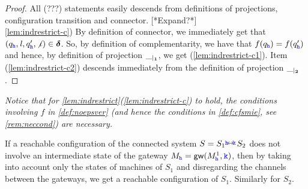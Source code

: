 \begin{proof}
All (???) statements easily
descends from definitions of projections, configuration transition and connector.
[*Expand?*]\\
\ref{lem:indrestrict-c})
By definition of connector, we immediately get that $(q_{\mathtt{\color{blue}{ {h}}}},\mathit{l},q'_{\mathtt{\color{blue}{ {h}}}},\not\iota)\in\bm{\delta}$.
So, by definition of complementarity, we have that $f(q_{\mathtt{\color{blue}{ {h}}}})=f(q'_{\mathtt{\color{blue}{ {h}}}})$ and hence,
by definition of projection ${\_}_{\mid_{\mathbf{1}}}$, we get (\ref{lem:indrestrict-c1}).
Item (\ref{lem:indrestrict-c2}) descends immediately from the definition of projection ${\_}_{\mid_{\mathbf{2}}}$.
\end{proof}

\begin{remark}{\em
Notice that for \cref{lem:indrestrict}(\ref{lem:indrestrict-c}) to hold,  
the conditions involving $f$ in \cref{def:noepsver} (and hence the conditions in \cref{def:cfsmie},
see \cref{rem:neccond}) are necessary.\finex
}
\end{remark}



If a reachable configuration of the connected system $S={S_{1}}\stackrel{\hspace{-3pt}{ \ensuremath{\mathtt{\color{blue}{ {h}}}} }\!\leftrightarrow\!{\mathtt{\color{blue}{ {k}}}}\!}{} {S_{2}}$ does not involve an intermediate state of the gateway
$M_{\mathtt{\color{blue}{ {h}}}} = \mathsf{gw}(M^1_{\mathtt{\color{blue}{ {h}}}}, {\mathtt{\color{blue}{ {k}}}})$, %
then by taking into account only the states of machines of $S_1$ and disregarding
the channels between the gateways, %
we get a
reachable configuration of $S_1$. Similarly for $S_2$.

